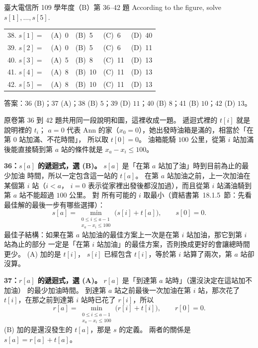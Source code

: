 \begin{pastexam}[label={px:ntu-109-comm-dsa-36}]{臺大電信所 109 學年度（B）第 36--42 題}
According to the figure, solve $s[1],\ldots,s[5]$.

\noindent\begin{tabular}{@{}l@{\quad}l@{\quad}l@{\quad}l@{\quad}l@{}}
38. $s[1]=$ & (A)~0 & (B)~5 & (C)~6 & (D)~40 \\
39. $s[2]=$ & (A)~0 & (B)~5 & (C)~6 & (D)~11 \\
40. $s[3]=$ & (A)~5 & (B)~8 & (C)~11 & (D)~13 \\
41. $s[4]=$ & (A)~8 & (B)~10 & (C)~11 & (D)~13 \\
42. $s[5]=$ & (A)~8 & (B)~10 & (C)~11 & (D)~13
\end{tabular}
\end{pastexam}

\begin{pastsoln}
答案：36 (B)；37 (A)；38 (B) $5$；39 (D) $11$；40 (B) $8$；41 (B) $10$；42 (D) $13$。

原卷第 36 到 42 題共用同一段說明和圖，這裡收成一題。 遞迴式裡的 $t[i]$ 就是說明裡的 $t_i$；
$a = 0$ 代表 Ann 的家（$x_0 = 0$），她出發時油箱是滿的，相當於「在第 $0$ 站加滿、不花時間」，
所以取 $t[0] = 0$。 油箱能騎 $100$ 公里，從第 $i$ 站加滿後能直接騎到第 $a$ 站的條件就是
$x_a - x_i \le 100$。

\textbf{36：$s[a]$ 的遞迴式，選 (B)。} $s[a]$ 是「在第 $a$ 站加了油」時到目前為止的最少加油
時間，所以一定包含這一站的 $t[a]$。 在第 $a$ 站加油之前，上一次加油在某個第 $i$ 站（$i < a$，
$i = 0$ 表示從家裡出發後都沒加過），而且從第 $i$ 站滿油騎到第 $a$ 站不能超過 $100$ 公里。 對
所有可能的 $i$ 取最小（資結書第~18.1.5~節：先看最佳解的最後一步有哪些選擇）：
\[
s[a] = \min_{\substack{0 \le i \le a - 1\\ x_a - x_i \le 100}} \bigl(s[i] + t[a]\bigr), \qquad s[0] = 0 .
\]
最佳子結構：如果在第 $a$ 站加油的最佳方案上一次是在第 $i$ 站加油，那它到第 $i$ 站為止的部分
一定是「在第 $i$ 站加油」的最佳方案，否則換成更好的會讓總時間更少。 (A) 加的是 $t[i]$，
$s[i]$ 已經包含 $t[i]$，等於第 $i$ 站算了兩次，第 $a$ 站卻沒算。

\textbf{37：$r[a]$ 的遞迴式，選 (A)。} $r[a]$ 是「到達第 $a$ 站時」（還沒決定在這站加不加油）
的最少加油時間。 到達第 $a$ 站之前最後一次加油在第 $i$ 站，那次花了 $t[i]$，在那之前到達第
$i$ 站時已花了 $r[i]$，所以
\[
r[a] = \min_{\substack{0 \le i \le a - 1\\ x_a - x_i \le 100}} \bigl(r[i] + t[i]\bigr), \qquad r[0] = 0 .
\]
(B) 加的是還沒發生的 $t[a]$，那是 $s$ 的定義。 兩者的關係是 $s[a] = r[a] + t[a]$。


\end{pastsoln}
